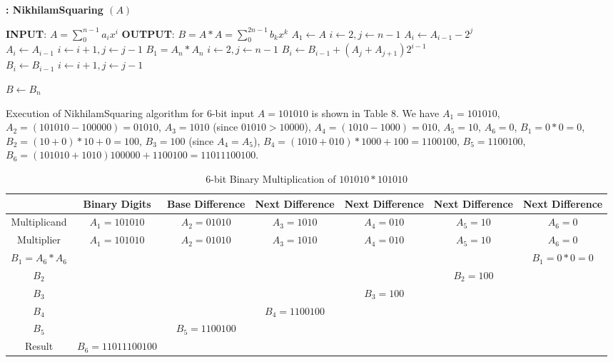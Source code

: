 \documentclass[conference]{IEEEtran}
\begin{document}
\begin{algorithm}
\caption{\bf :  NikhilamSquaring $(A)$}
\begin{algorithmic}
\STATE \textbf{INPUT}: $A=\sum_{0}^{n-1} a_i x^i$
\STATE \textbf{OUTPUT}: $B=A*A=\sum_{0}^{2n-1} b_k x^k $
   \STATE $A_1 \leftarrow A$ 
   \STATE $i\leftarrow 2, j\leftarrow n-1$
   {
   \STATE $A_i \leftarrow A_{i-1} - 2^j $ \\
   \ELSE \STATE $A_i \leftarrow A_{i-1}$
   \ENDIF
   \STATE $i\leftarrow i+1, j\leftarrow j-1$
   }
   \ENDWHILE
   \STATE $B_1 = A_n * A_n$
   \STATE $i\leftarrow 2, j\leftarrow n-1$
   {
   \STATE $B_i \leftarrow B_{i-1} + (A_j+ A_{j+1})2^{i-1} $ \\
   \ELSE \STATE $B_i \leftarrow B_{i-1} $
   \ENDIF
   \STATE $i\leftarrow i+1, j\leftarrow j-1$
   }
   \ENDWHILE

   \RETURN $B \leftarrow B_n$
\end{algorithmic}
\end{algorithm}

Execution of NikhilamSquaring algorithm for $6$-bit input $A=101010 $ is shown in Table 8. We have $A_1=101010$, $A_2=(101010-100000)=01010$, $A_3=1010$ (since $01010 > 10000$), $A_4=(1010-1000)=010$, $A_5=10$, $A_6=0$, $B_1 =0*0=0$, $B_2 = (10+0)*10+0=100 $, $B_3=100$ (since $A_4 = A_5$), $B_4 = (1010+010)*1000+100=1100100$, $B_5 =1100100$,  $B_6 = (101010+1010)100000 + 1100100= 11011100100 $.

\begin{table*}[ht]
\renewcommand{\arraystretch}{1.3}
\caption{$6$-bit Binary Multiplication of $101010*101010$}
\label{table 8}
\begin{center}
\begin{tabular}{|c| c| c| c| c| c| c|} 
\hline
 & Binary Digits & Base Difference  & Next Difference & Next Difference & Next Difference & Next Difference \\ [1ex] \hline\hline 
Multiplicand & $ A_1=101010$ & $A_2=01010$ & $A_3=1010$ & $A_4=010$ & $A_5=10$ & $A_6=0$ \\ \hline
Multiplier & $ A_1=101010$ & $A_2=01010$ & $A_3=1010$ & $A_4=010$ & $A_5=10$ & $A_6=0$  \\ \hline
$B_1 = A_6 * A_6$ &  &  &  &  &  & $B_1 =0*0=0$  \\ \hline
$B_2$ &  &  &  &  & $B_2 =100$ & \\ \hline
$B_3$ &  &  &  &$B_3 =100$ &  & \\ \hline
$B_4$ &  &  &$B_4 =1100100$ &  &  & \\ \hline
$B_5$ &  &  $B_5 =1100100$ &  &  &  & \\ \hline
Result & $B_6=11011100100$ &  &  &  &  & \\ [1ex] \hline

\end{tabular} 
\end{center}
\end{table*} 
\end{document}

